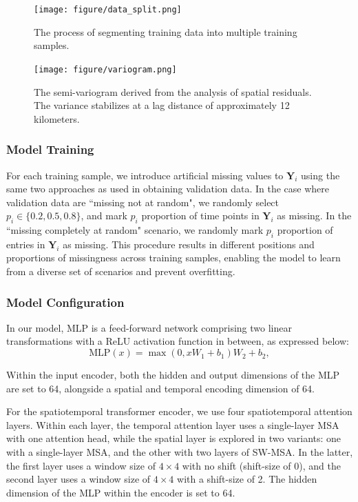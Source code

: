 \documentclass[11pt]{article}
\begin{document}
\begin{figure}
\centering
\texttt{[image: figure/data\_split.png]}
\caption{ The process of segmenting training data into multiple training samples.}
\label{fig: data_split}
\end{figure}

\begin{figure}
\centering
\texttt{[image: figure/variogram.png]}
\caption{The semi-variogram derived from the analysis of spatial residuals. The variance stabilizes at a lag distance of approximately 12 kilometers.}
\label{fig: variogram}
\end{figure}




\subsubsection*{Model Training}
For each training sample, we introduce artificial missing values to $\boldsymbol{Y}_i$ using the same two approaches as used in obtaining validation data. In the case where validation data are ``missing not at random", we randomly select $p_i \in \{0.2, 0.5, 0.8\}$, and mark $p_i$ proportion of time points in $\boldsymbol{Y}_i$ as missing. In the ``missing completely at random" scenario, we randomly mark $p_i$ proportion of entries in $\boldsymbol{Y}_i$ as missing. This procedure results in different positions and proportions of missingness across training samples, enabling the model to learn from a diverse set of scenarios and prevent overfitting.



\subsubsection*{Model Configuration}
In our model, $\text{MLP}$ is a feed-forward network comprising two linear transformations with a ReLU activation function in between, as expressed below:
\begin{equation}
    \text{MLP}(x)= \max (0, xW_1+b_1)W_2+b_2,
\end{equation}

Within the input encoder, both the hidden and output dimensions of the MLP are set to 64, alongside a spatial and temporal encoding dimension of 64. 

For the spatiotemporal transformer encoder, we use four spatiotemporal attention layers. Within each layer, the temporal attention layer uses a single-layer MSA with one attention head, while the spatial layer is explored in two variants: one with a single-layer MSA, and the other with two layers of SW-MSA. In the latter, the first layer uses a window size of $4\times 4$ with no shift (shift-size of 0), and the second layer uses a window size of $4 \times 4$ with a shift-size of 2. The hidden dimension of the MLP within the encoder is set to 64. 
\end{document}
